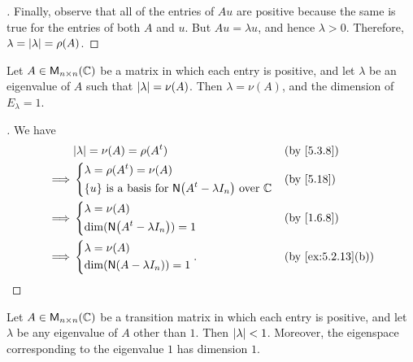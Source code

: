 \begin{proof}[]
  Finally, observe that all of the entries of \(Au\) are positive because the same is true for the entries of both \(A\) and \(u\).
  But \(Au = \lambda u\), and hence \(\lambda > 0\).
  Therefore, \(\lambda = \left\lvert\lambda\right\rvert = \rho(A)\).
\end{proof}

\begin{cor}\label{5.3.13}
  Let \(A \in \ms[n][n][\C]\) be a matrix in which each entry is positive, and let \(\lambda\) be an eigenvalue of \(A\) such that \(\left\lvert\lambda\right\rvert = \nu(A)\).
  Then \(\lambda = \nu(A)\), and the dimension of \(E_{\lambda} = 1\).
\end{cor}

\begin{proof}[]
  We have
  \begin{align*}
             & \abs{\lambda} = \nu(A) = \rho(\tp{A})                                                       &  & \by{5.3.8} \\
    \implies & \begin{dcases}
                 \lambda = \rho(\tp{A}) = \nu(A) \\
                 \set{u} \text{ is a basis for } \ns{\tp{A} - \lambda I_n} \text{ over } \C
               \end{dcases} &  & \by{5.18}                  \\
    \implies & \begin{dcases}
                 \lambda = \nu(A) \\
                 \dim(\ns{\tp{A} - \lambda I_n}) = 1
               \end{dcases}                          &  & \by{1.6.8}                                           \\
    \implies & \begin{dcases}
                 \lambda = \nu(A) \\
                 \dim(\ns{A - \lambda I_n}) = 1
               \end{dcases}.                                                              &  & \by{ex:5.2.13}[b]
  \end{align*}
\end{proof}

\begin{cor}\label{5.3.14}
  Let \(A \in \ms[n][n][\C]\) be a transition matrix in which each entry is positive, and let \(\lambda\) be any eigenvalue of \(A\) other than \(1\).
  Then \(\left\lvert\lambda\right\rvert < 1\).
  Moreover, the eigenspace corresponding to the eigenvalue \(1\) has dimension \(1\).
\end{cor}

